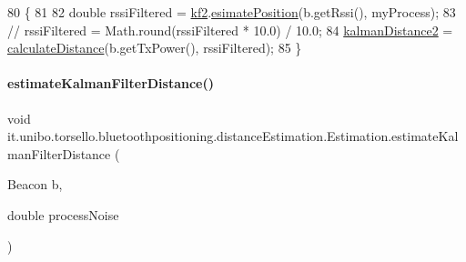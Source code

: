 \begin{DoxyCode}
80                                                                    \{
81 
82         \textcolor{keywordtype}{double} rssiFiltered = \hyperlink{classit_1_1unibo_1_1torsello_1_1bluetoothpositioning_1_1distanceEstimation_1_1Estimation_a1d085f6c0d1ac7db6c60fb20ae3a6475_a1d085f6c0d1ac7db6c60fb20ae3a6475}{kf2}.\hyperlink{classit_1_1unibo_1_1torsello_1_1bluetoothpositioning_1_1filters_1_1kalmanFilter2_1_1KFilter2_a7cacbca71c01195a1ac7e00945d46f2f_a7cacbca71c01195a1ac7e00945d46f2f}{esimatePosition}(b.getRssi(), myProcess);
83 \textcolor{comment}{//        rssiFiltered = Math.round(rssiFiltered * 10.0) / 10.0;}
84         \hyperlink{classit_1_1unibo_1_1torsello_1_1bluetoothpositioning_1_1distanceEstimation_1_1Estimation_afdd3e163fef5ed462d448a58a3575c4e_afdd3e163fef5ed462d448a58a3575c4e}{kalmanDistance2} = \hyperlink{classit_1_1unibo_1_1torsello_1_1bluetoothpositioning_1_1distanceEstimation_1_1Estimation_a6e33d4e0b776517a86c6aa87cd51b66b_a6e33d4e0b776517a86c6aa87cd51b66b}{calculateDistance}(b.getTxPower(), rssiFiltered);
85     \}
\end{DoxyCode}
\hypertarget{classit_1_1unibo_1_1torsello_1_1bluetoothpositioning_1_1distanceEstimation_1_1Estimation_ac3451825d5672d5e761269afc563e88e_ac3451825d5672d5e761269afc563e88e}{}\label{classit_1_1unibo_1_1torsello_1_1bluetoothpositioning_1_1distanceEstimation_1_1Estimation_ac3451825d5672d5e761269afc563e88e_ac3451825d5672d5e761269afc563e88e} 
\paragraph{\texorpdfstring{estimate\+Kalman\+Filter\+Distance()}{estimateKalmanFilterDistance()}}
{\footnotesize\ttfamily void it.\+unibo.\+torsello.\+bluetoothpositioning.\+distance\+Estimation.\+Estimation.\+estimate\+Kalman\+Filter\+Distance (\begin{DoxyParamCaption}\item[{Beacon}]{b,  }\item[{double}]{process\+Noise }\end{DoxyParamCaption})\hspace{0.3cm}{\ttfamily [private]}}


